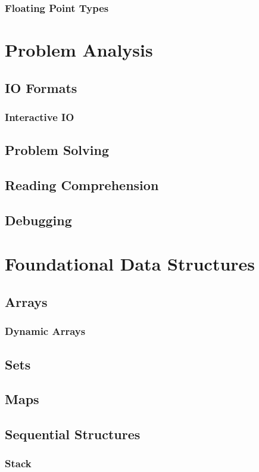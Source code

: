 \documentclass[12pt]{article}
\begin{document}
\subsubsection{Floating Point Types}

\section{Problem Analysis}
\subsection{IO Formats}
\subsubsection{Interactive IO}
\subsection{Problem Solving}
\subsection{Reading Comprehension}
\subsection{Debugging}

\section{Foundational Data Structures}
\subsection{Arrays}
\subsubsection{Dynamic Arrays}
\subsection{Sets}
\subsection{Maps}
\subsection{Sequential Structures}
\subsubsection{Stack}
\end{document}
